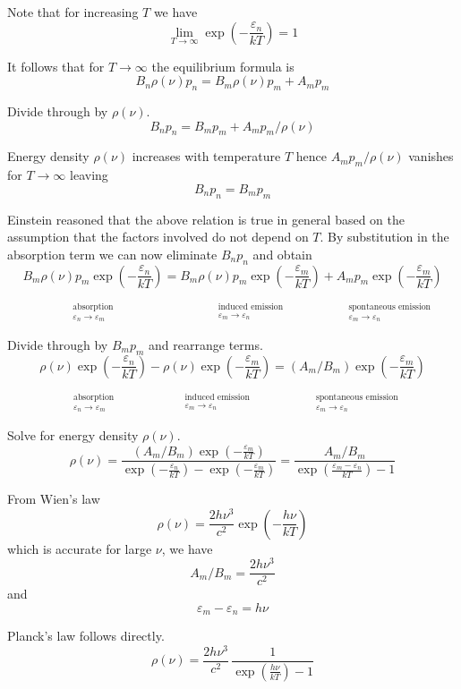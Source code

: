 \documentclass[12pt]{article}
\newcommand\BNM{B_n} %
\newcommand\BMN{B_m} %
\newcommand\AMN{A_m} %
\newcommand\ABSORPTION{\substack{\phantom{0}\\ \text{absorption}\\ \varepsilon_n\rightarrow\varepsilon_m}}
\newcommand\INDUCED{\substack{\phantom{0}\\ \text{induced emission}\\ \varepsilon_m\rightarrow\varepsilon_n}}
\newcommand\SPONTANEOUS{\substack{\phantom{0}\\ \text{spontaneous emission}\\ \varepsilon_m\rightarrow\varepsilon_n}}
\begin{document}
\noindent
Note that for increasing $T$ we have
\begin{equation*}
\lim_{T\rightarrow\infty}\exp\left(-\frac{\varepsilon_n}{kT}\right)=1
\end{equation*}

\noindent
It follows that for $T\rightarrow\infty$ the equilibrium formula is
\begin{equation*}
\BNM\rho(\nu)p_n
=\BMN\rho(\nu)p_m
+\AMN p_m
\end{equation*}

\noindent
Divide through by $\rho(\nu)$.
\begin{equation*}
\BNM p_n=\BMN p_m+\AMN p_m/\rho(\nu)
\end{equation*}

\noindent
Energy density $\rho(\nu)$ increases with temperature $T$
hence $\AMN p_m/\rho(\nu)$ vanishes for $T\rightarrow\infty$ leaving
\begin{equation*}
\BNM p_n=\BMN p_m
\end{equation*}

\noindent
Einstein reasoned that the above relation is true in general based on the assumption that
the factors involved do not depend on $T$.
By substitution in the absorption term we can now eliminate $B_np_n$ and obtain
\begin{equation*}
\underset{\ABSORPTION}{\BMN\rho(\nu)p_m\exp\left(-\frac{\varepsilon_n}{kT}\right)}
=\underset{\INDUCED}{\BMN\rho(\nu)p_m\exp\left(-\frac{\varepsilon_m}{kT}\right)}
+\underset{\SPONTANEOUS}{\AMN p_m\exp\left(-\frac{\varepsilon_m}{kT}\right)}
\end{equation*}

\noindent
Divide through by $\BMN p_m$ and rearrange terms.
\begin{equation*}
\underset{\ABSORPTION}{\rho(\nu)\exp\left(-\frac{\varepsilon_n}{kT}\right)}
-\underset{\INDUCED}{\rho(\nu)\exp\left(-\frac{\varepsilon_m}{kT}\right)}
=\underset{\SPONTANEOUS}{(\AMN/\BMN)\exp\left(-\frac{\varepsilon_m}{kT}\right)}
\end{equation*}

\noindent
Solve for energy density $\rho(\nu)$.
\begin{equation*}
\rho(\nu)=\frac
{(\AMN/\BMN)\exp\left(-\frac{\varepsilon_m}{kT}\right)}
{\exp\left(-\frac{\varepsilon_n}{kT}\right)-\exp\left(-\frac{\varepsilon_m}{kT}\right)}
=\frac{\AMN/\BMN}{\exp\left(\frac{\varepsilon_m-\varepsilon_n}{kT}\right)-1}
\end{equation*}

\noindent
From Wien's law
\begin{equation*}
\rho(\nu)=\frac{2h\nu^3}{c^2}\exp\left(-\frac{h\nu}{kT}\right)
\end{equation*}
which is accurate for large $\nu$, we have
\begin{equation*}
\AMN/\BMN=\frac{2h\nu^3}{c^2}
\end{equation*}
and
\begin{equation*}
\varepsilon_m-\varepsilon_n=h\nu
\end{equation*}

\noindent
Planck's law follows directly.
\begin{equation*}
\rho(\nu)=\frac{2h\nu^3}{c^2}\,\frac{1}{\exp\left(\frac{h\nu}{kT}\right)-1}
\end{equation*}
\end{document}
